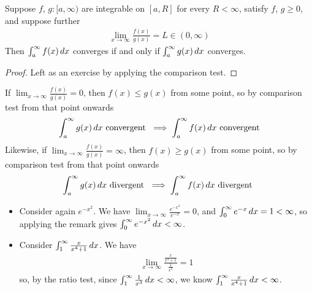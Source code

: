 \documentclass{../../template/note}
\begin{document}
    \begin{proposition}
        Suppose \(f\), \(g: [a, \infty)\) are integrable on \([a, R]\) for every \(R < \infty\), satisfy \(f\), \(g \geq 0\), and suppose further
        \begin{align*}
            \lim_{x \to \infty} \frac{f(x)}{g(x)} = L \in (0, \infty)
        \end{align*}
        Then \(\int_a^\infty f(x) \,d{x}\) converges if and only if \(\int_a^\infty g(x) \,d{x}\) converges.
    \end{proposition}
    
    \begin{proof}
        Left as an exercise by applying the comparison test.
    \end{proof}
    
    \begin{remark*}
        If \(\lim_{x \to \infty} \frac{f(x)}{g(x)} = 0\), then \(f(x) \leq g(x)\) from some point, so by comparison test from that point onwards
        \begin{align*}
            \int_a^\infty g(x) \,d{x} \text{ convergent } \implies \int_a^\infty f(x) \,d{x} \text{ convergent} 
        \end{align*}
        Likewise, if \(\lim_{x \to \infty} \frac{f(x)}{g(x)} = \infty\), then \(f(x) \geq g(x)\) from some point, so by comparison test from that point onwards
        \begin{align*}
            \int_a^\infty g(x) \,d{x} \text{ divergent } \implies \int_a^\infty f(x) \,d{x} \text{ divergent }
        \end{align*}
    \end{remark*}
    
    \begin{example*}
        \begin{itemize}
            \item Consider again \(e^{-x^2}\). We have \(\lim_{x \to \infty} \frac{e^{-x^2}}{e^{-x}} = 0\), and \(\int_0^\infty e^{-x} \,d{x} = 1 < \infty\), so applying the remark gives \(\int_0^\infty e^{-x^2} \,d{x} < \infty\).
            \item Consider \(\int_1^\infty \frac x{x^4+1} \,d{x}\). We have
            \begin{align*}
                \lim_{x \to \infty} \frac{\frac{x}{x^4+1}}{\frac 1 {x^3}} = 1
            \end{align*}
            so, by the ratio test, since \(\int_1^\infty \frac 1 {x^3} \,d{x} < \infty\), we know \(\int_1^\infty \frac{x}{x^4+1} \,d{x} < \infty\).
        \end{itemize}
    \end{example*}
    
\end{document}
